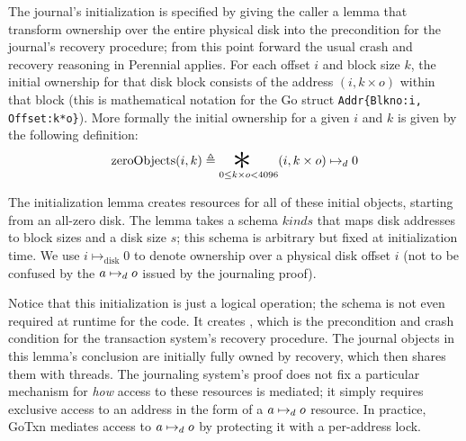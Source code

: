 The journal's initialization is specified by giving the caller a lemma that
transform ownership over the entire physical disk into the precondition for the
journal's recovery procedure; from this point forward the usual crash and
recovery reasoning in Perennial applies. For each offset $i$ and block size $k$, the initial ownership for that disk
block consists of the address $(i, k \times o)$ within that block (this is
mathematical notation for the Go struct
\texttt{Addr\{Blkno:\;i, Offset:\;k*o\}}).
More formally the initial ownership for a given $i$ and $k$ is given by the
following definition:
\[
  \operatorname{zeroObjects}(i, k) \defeq \bigast_{0 \leq k \times o < 4096} (i, k \times o) \mapstoDisk 0
\]


The initialization lemma  creates resources
for all of these initial objects,
starting from an all-zero disk. The lemma takes a schema
$\mathit{kinds}$ that maps disk addresses to block sizes and a disk size $s$;
this schema is arbitrary but fixed at initialization time. We use
$i \mapsto_{\mathrm{disk}} 0$ to denote ownership over a physical disk offset $i$
(not to be confused by the $a \mapstoDisk o$ issued by the journaling proof).
\begin{mathpar}
\end{mathpar}

Notice that this initialization is just a logical operation; the schema is not
even required at runtime for the code. It creates ,
which is the precondition and crash condition for the transaction system's
recovery procedure. The journal objects in this lemma's conclusion are initially
fully owned by recovery, which then shares them with threads. The journaling
system's proof does not fix a particular mechanism for \emph{how} access to these resources is mediated; it
simply requires exclusive access to an address in the form of a
$a \mapstoDisk o$ resource. In practice, GoTxn mediates access to
$a \mapstoDisk o$ by protecting it with a per-address lock.

